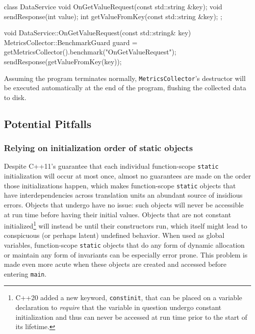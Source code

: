 \begin{emcppshiddenlisting}[emcppsbatch=e14]
class DataService {
      void OnGetValueRequest(const std::string &key);
      void sendResponse(int value);
      int getValueFromKey(const std::string &key);
};
\end{emcppshiddenlisting}
\begin{emcppslisting}[emcppsbatch=e14]
void DataService::OnGetValueRequest(const std::string& key)
{
    MetricsCollector::BenchmarkGuard guard =
                          getMetricsCollector().benchmark("OnGetValueRequest");
    sendResponse(getValueFromKey(key));
}
\end{emcppslisting}

\noindent Assuming the program terminates normally, \lstinline!MetricsCollector!'s
destructor will be executed automatically at the end of the program,
flushing the collected data to disk.

\subsection[Potential Pitfalls]{Potential Pitfalls}\label{potential-pitfalls-functionstatic}

\subsubsection[Relying on initialization order of \tt{static} objects]{Relying on initialization order of {\SubsubsecCode static} objects}\label{relying-on-initialization-order-of-static-objects}

Despite C++11's guarantee that each individual function-scope
\lstinline!static! initialization will occur at most once, almost no
guarantees are made on the order those initializations happen, which
makes function-scope \lstinline!static! objects that have interdependencies
across translation units an abundant source of insidious errors. Objects that undergo  have no issue:
such objects will never be accessible at run time before having their
initial values. Objects that are not constant
initialized{\cprotect\footnote{C++20 added a new keyword,
\lstinline!constinit!, that can be placed on a variable declaration to
\emph{require} that the variable in question undergo constant
initialization and thus can never be accessed at run time prior to the
  start of its lifetime.}} will instead be 
until their constructors run, which itself might lead to conspicuous (or
perhaps latent) undefined behavior. When used as global variables,
function-scope \lstinline!static! objects that do any form of dynamic
allocation or maintain any form of invariants can be especially error
prone. This problem is made even more acute when these objects are
created and accessed before entering \lstinline!main!.

